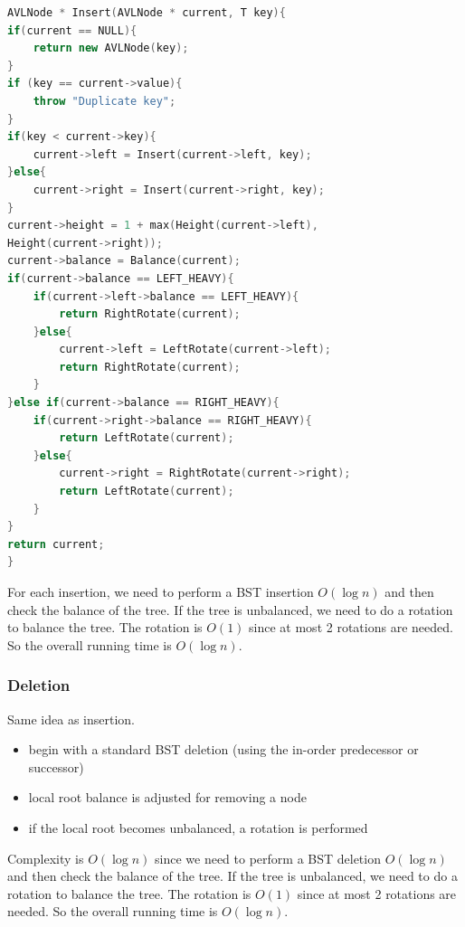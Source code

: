 \documentclass[letterpaper,12pt]{article}
\begin{document}
\begin{algorithmic}
    \Else 
        \EndIf
    \EndIf

        \EndIf
    \Else
        \EndIf
    \EndIf
\end{algorithmic}
\begin{lstlisting}[language=C++]
AVLNode * Insert(AVLNode * current, T key){
if(current == NULL){
    return new AVLNode(key);
}
if (key == current->value){
    throw "Duplicate key";
}
if(key < current->key){
    current->left = Insert(current->left, key);
}else{
    current->right = Insert(current->right, key);
}
current->height = 1 + max(Height(current->left), 
Height(current->right));
current->balance = Balance(current);
if(current->balance == LEFT_HEAVY){
    if(current->left->balance == LEFT_HEAVY){
        return RightRotate(current);
    }else{
        current->left = LeftRotate(current->left);
        return RightRotate(current);
    }
}else if(current->balance == RIGHT_HEAVY){
    if(current->right->balance == RIGHT_HEAVY){
        return LeftRotate(current);
    }else{
        current->right = RightRotate(current->right);
        return LeftRotate(current);
    }
}
return current;
}
\end{lstlisting}
For each insertion, we need to perform a BST insertion $O(\log n)$ and then check the balance of the tree. If the tree is unbalanced, we need to do a rotation to balance the tree. The rotation is $O(1)$ since at most 2 rotations are needed. So the overall running time is $O(\log n)$.
\subsubsection{Deletion}
Same idea as insertion. \begin{itemize}
    \item begin with a standard BST deletion (using the in-order predecessor or successor)
    \item local root balance is adjusted for removing a node
    \item if the local root becomes unbalanced, a rotation is performed
\end{itemize}
Complexity is $O(\log n)$ since we need to perform a BST deletion $O(\log n)$ and then check the balance of the tree. If the tree is unbalanced, we need to do a rotation to balance the tree. The rotation is $O(1)$ since at most 2 rotations are needed. So the overall running time is $O(\log n)$.
\end{document}
